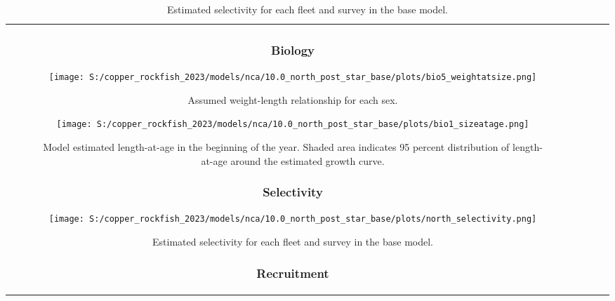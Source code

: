 \documentclass[11pt,
  letterpaper,
]{article}
\begin{document}
\begin{longtable}[t]{c>{\centering\arraybackslash}p{2cm}>{\centering\arraybackslash}p{2cm}>{\centering\arraybackslash}p{2cm}}
\pagebreak

\pagebreak

\subsubsection{Biology}\label{biology-1}

\begin{figure}
{\centering
\texttt{[image: S:/copper\_rockfish\_2023/models/nca/10.0\_north\_post\_star\_base/plots/bio5\_weightatsize.png]}
}
\caption{Assumed weight-length relationship for each sex.\label{fig:est-len-wght}}
\end{figure}

\pagebreak

\begin{figure}
{\centering
\texttt{[image: S:/copper\_rockfish\_2023/models/nca/10.0\_north\_post\_star\_base/plots/bio1\_sizeatage.png]}
}
\caption{Model estimated length-at-age in the beginning of the year. Shaded area indicates 95 percent distribution of length-at-age around the estimated growth curve.\label{fig:mod-est-len-age}}
\end{figure}

\pagebreak

\subsubsection{Selectivity}\label{selectivity}

\begin{figure}
{\centering
\texttt{[image: S:/copper\_rockfish\_2023/models/nca/10.0\_north\_post\_star\_base/plots/north\_selectivity.png]}
}
\caption{Estimated selectivity for each fleet and survey in the base model.\label{fig:est-selex}}
\end{figure}

\pagebreak

\subsubsection{Recruitment}\label{recruitment}


\end{longtable}
\end{document}
